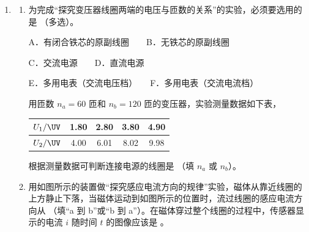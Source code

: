 \documentclass[\gkver]{gaokaozhenti}
\begin{document}
\begin{enumerate}
{	（3）沿如图所示内切的路线行驶时间最短，由几何关系得 $r'^{2}=r_{1}^{2}+\left[r'-\left(r_{1}-\frac{d}{2}\right)\right]^{2}$，代入数据可得 $r'=12.5\Um$。


	汽车沿该线路行驶的最大速度为 $v'$，由牛顿第二定律得 $kmg=m\frac{v'^2}{r'}$，解得 $v'=\sqrt{kgr'}=12.5\Ums$，由 $\sin\theta=\frac{r_{1}}{r'}=0.8$，则对应的圆心角为 $2\theta=106^\circ$，线路长度为 $s=\frac{106^\circ}{360^\circ}\times2\pi r'\approx23.1\Um$，故最短时间为 $t'=\frac{s}{v'}\approx1.8\Us$。

}

\item
\begin{enumerate}
	\item
	为完成“探究变压器线圈两端的电压与匝数的关系”的实验，必须要选用的是 （多选）。

	A．有闭合铁芯的原副线圈　　B．无铁芯的原副线圈

	C．交流电源　　D．直流电源

	E．多用电表（交流电压档）　　F．多用电表（交流电流档）

	用匝数 $n_{a}=60$ 匝和 $n_{b}=120$ 匝的变压器，实验测量数据如下表，

	\begin{center}
	\begin{tabular}{|c|c|c|c|c|}
	\hline
	$U_{1}/\UV$ & 1.80 & 2.80 & 3.80 & 4.90 \\
	\hline
	$U_{2}/\UV$ & 4.00 & 6.01 & 8.02 & 9.98 \\
	\hline
	\end{tabular}
	\end{center}

	根据测量数据可判断连接电源的线圈是 （填 $n_{a}$ 或 $n_{b}$）。
	\item
	用如图所示的装置做“探究感应电流方向的规律”实验，磁体从靠近线圈的上方静止下落，当磁体运动到如图所示的位置时，流过线圈的感应电流方向从 （填“a 到 b”或“b 到 a”）。在磁体穿过整个线圈的过程中，传感器显示的电流 $i$ 随时间 $t$ 的图像应该是 。
\end{enumerate}



\end{enumerate}
\end{document}
